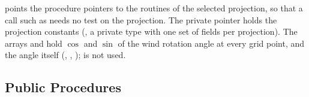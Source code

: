  points the procedure pointers to the routines of the
selected projection, so that a call such as  needs no test on the projection. The private pointer  holds
the projection constants (, a private type with one
set of fields per projection). The arrays  and  hold
$\cos$ and $\sin$ of the wind rotation angle at every grid point, and
 the angle itself (, , );
 is not used.

\subsection{Public Procedures}
\label{subsec:proj_public}

